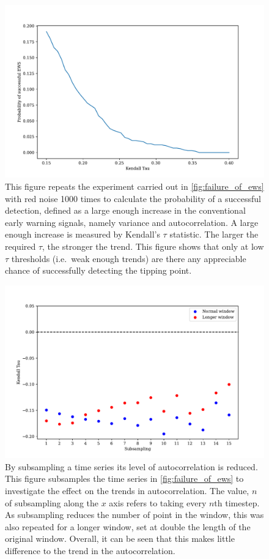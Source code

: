 \begin{figure}
  \centering
  \includegraphics[width=\textwidth]{pofsuccess}
  \caption[Probability of detection for conventional early warning signals]{This figure repeats the experiment carried out in \cref{fig:failure_of_ews}
    with red noise 1000 times to calculate the probability of a successful detection, defined as a large enough increase in the conventional
    early warning signals, namely variance and autocorrelation. A large enough increase is measured by Kendall's $\tau$ statistic. The larger the
    required $\tau$, the stronger the trend. This figure shows that only at low $\tau$ thresholds (i.e.\ weak enough trends) are there any appreciable
  chance of successfully detecting the tipping point.}
  \label{fig:prob_of_suc}
\end{figure}

\begin{figure}
  \centering
  \includegraphics[width=\textwidth]{subsampling}
  \caption[Effect of Subsampling]{By subsampling a time series its level of autocorrelation is reduced. This figure subsamples the time series in
    \cref{fig:failure_of_ews} to investigate the effect on the trends in autocorrelation. The value, $n$ of subsampling along the $x$ axis refers to taking
    every $n$th timestep. As subsampling reduces the number of point in the window, this was also repeated for a longer window, set at double the length of the
  original window. Overall, it can be seen that this makes little difference to the trend in the autocorrelation.}
  \label{fig:subsampling}
\end{figure}


